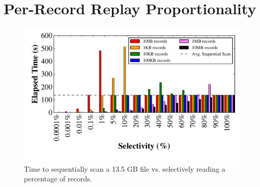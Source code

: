 \section{Per-Record Replay Proportionality}
\label{sec:recovery_cost}

\begin{figure}
  \centering
  \includegraphics[width=\columnwidth]{fault_tolerance/graphs/scan_vs_seek}
  \caption{\label{fig:seek-vs-scan} Time to sequentially scan a 13.5 GB file
    vs. selectively reading a percentage of records.}
\end{figure}

